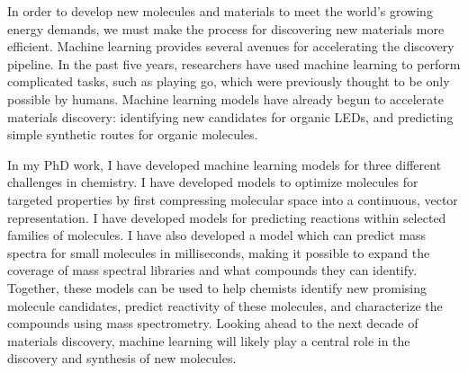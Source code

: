 In order to develop new molecules and materials to meet the world's growing energy demands, we must make the process for discovering new materials more efficient. Machine learning provides several avenues for accelerating the discovery pipeline. In the past five years, researchers have used machine learning to perform complicated tasks, such as playing go, which were previously thought to be only possible by humans. Machine learning models have already begun to accelerate materials discovery: identifying new candidates for organic LEDs, and predicting simple synthetic routes for organic molecules. 

In my PhD work, I have developed machine learning models for three different challenges in chemistry. I have developed models to optimize molecules for targeted properties by first compressing molecular space into a continuous, vector representation. I have developed models for predicting reactions within selected families of molecules. I have also developed a model which can predict mass spectra for small molecules in milliseconds, making it possible to expand the coverage of mass spectral libraries and what compounds they can identify. Together, these models can be used to help chemists identify new promising molecule candidates, predict reactivity of these molecules, and characterize the compounds using mass spectrometry. Looking ahead to the next decade of materials discovery, machine learning will likely play a central role in the discovery and synthesis of new molecules. 

